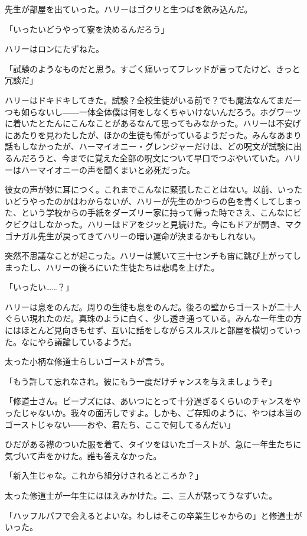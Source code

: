 \documentclass[10pt,a4paper]{article}
\begin{document}
\begin{CJK}{UTF8}{min}
先生が部屋を出ていった。ハリーはゴクリと生つばを飲み込んだ。

「いったいどうやって寮を決めるんだろう」

ハリーはロンにたずねた。

「試験のようなものだと思う。すごく痛いってフレッドが言ってたけど、きっと冗談だ」

ハリーはドキドキしてきた。試験？全校生徒がいる前で？でも魔法なんてまだ一つも如らないし――一体全体僕は何をしなくちゃいけないんだろう。ホグワーツに着いたとたんにこんなことがあるなんて思ってもみなかった。ハリーは不安げにあたりを見わたしたが、ほかの生徒も怖がっているようだった。みんなあまり話もしなかったが、ハーマイオニー・グレンジャーだけは、どの呪文が試験に出るんだろうと、今までに覚えた全部の呪文について早口でつぶやいていた。ハリーはハーマイオニーの声を聞くまいと必死だった。

彼女の声が妙に耳につく。これまでこんなに緊張したことはない。以前、いったいどうやったのかはわからないが、ハリーが先生のかつらの色を青くしてしまった、という学校からの手紙をダーズリー家に持って帰った時でさえ、こんなにビクビクはしなかった。ハリーはドアをジッと見続けた。今にもドアが開き、マクゴナガル先生が戻ってきてハリーの暗い運命が決まるかもしれない。

突然不思議なことが起こった。ハリーは驚いて三十センチも宙に跳び上がってしまったし、ハリーの後ろにいた生徒たちは悲鳴を上げた。

「いったい……？」

ハリーは息をのんだ。周りの生徒も息をのんだ。後ろの壁からゴーストが二十人ぐらい現れたのだ。真珠のように白く、少し透き通っている。みんな一年生の方にはほとんど見向きもせず、互いに話をしながらスルスルと部屋を横切っていった。なにやら議論しているようだ。

太った小柄な修道士らしいゴーストが言う。

「もう許して忘れなされ。彼にもう一度だけチャンスを与えましょうぞ」

「修道士さん。ピーブズには、あいつにとって十分過ぎるくらいのチャンスをやったじゃないか。我々の面汚しですよ。しかも、ご存知のように、やつは本当のゴーストじゃない――おや、君たち、ここで何してるんだい」

ひだがある襟のついた服を着て、タイツをはいたゴーストが、急に一年生たちに気づいて声をかけた。誰も答えなかった。

「新入生じゃな。これから組分けされるところか？」

太った修道士が一年生にほほえみかけた。二、三人が黙ってうなずいた。

「ハッフルパフで会えるとよいな。わしはそこの卒業生じゃからの」と修道士がいった。


\end{CJK}
\end{document}
